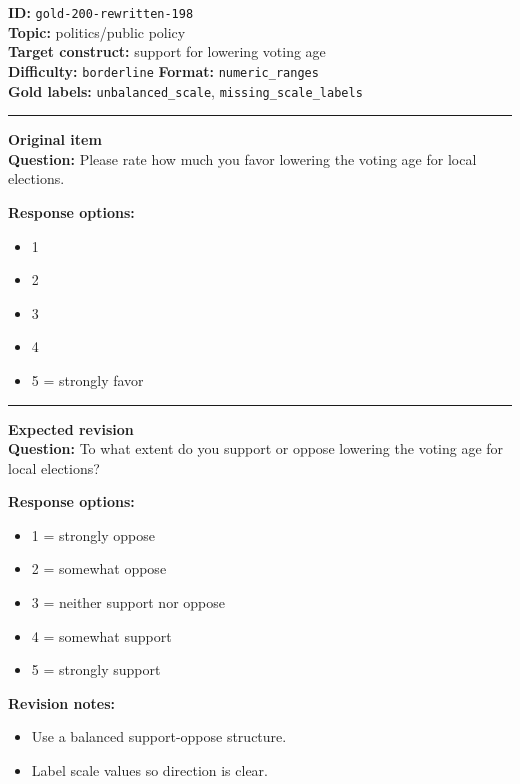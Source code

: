 \documentclass[10pt,a4paper]{article}
\newcommand{\sectionline}{\vspace{0.15em}\hrule\vspace{0.35em}}
\begin{document}
\begin{tcolorbox}[colframe=FlawRed,colback=white,colbacktitle=FlawRed!9,coltitle=black,title={Item 198\hfill Flawed item}]
\textbf{ID:} \texttt{gold-200-rewritten-198}\\
\textbf{Topic:} politics/public policy\\
\textbf{Target construct:} support for lowering voting age\\
\textbf{Difficulty:} \texttt{borderline} \quad \textbf{Format:} \texttt{numeric\_ranges}\\
\textbf{Gold labels:} \texttt{unbalanced\_scale}, \texttt{missing\_scale\_labels}\\
\sectionline
\textbf{Original item}\\
\textbf{Question:} Please rate how much you favor lowering the voting age for local elections.
\par\textbf{Response options:}
\begin{itemize}
\item 1
\item 2
\item 3
\item 4
\item 5 = strongly favor
\end{itemize}
\sectionline
\textbf{Expected revision}\\
\textbf{Question:} To what extent do you support or oppose lowering the voting age for local elections?
\par\textbf{Response options:}
\begin{itemize}
\item 1 = strongly oppose
\item 2 = somewhat oppose
\item 3 = neither support nor oppose
\item 4 = somewhat support
\item 5 = strongly support
\end{itemize}
\par\textbf{Revision notes:}
\begin{itemize}
\item Use a balanced support-oppose structure.
\item Label scale values so direction is clear.
\end{itemize}
\end{tcolorbox}
\end{document}
